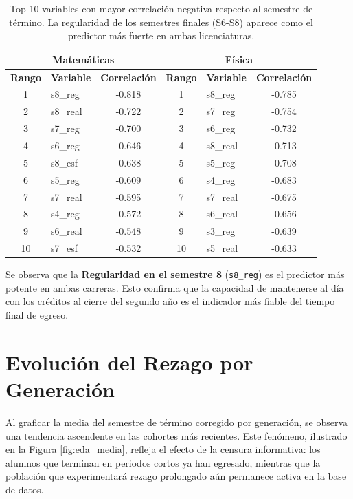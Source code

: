 \begin{table}[H]
\centering
\footnotesize
\begin{tabular}{|c|l|c|c|l|c|}
\hline
\multicolumn{3}{|c|}{\textbf{Matemáticas}} & \multicolumn{3}{c|}{\textbf{Física}} \\ \hline
\textbf{Rango} & \textbf{Variable} & \textbf{Correlación} & \textbf{Rango} & \textbf{Variable} & \textbf{Correlación} \\ \hline
1 & s8\_reg & -0.818 & 1 & s8\_reg & -0.785 \\ \hline
2 & s8\_real & -0.722 & 2 & s7\_reg & -0.754 \\ \hline
3 & s7\_reg & -0.700 & 3 & s6\_reg & -0.732 \\ \hline
4 & s6\_reg & -0.646 & 4 & s8\_real & -0.713 \\ \hline
5 & s8\_esf & -0.638 & 5 & s5\_reg & -0.708 \\ \hline
6 & s5\_reg & -0.609 & 6 & s4\_reg & -0.683 \\ \hline
7 & s7\_real & -0.595 & 7 & s7\_real & -0.675 \\ \hline
8 & s4\_reg & -0.572 & 8 & s6\_real & -0.656 \\ \hline
9 & s6\_real & -0.548 & 9 & s3\_reg & -0.639 \\ \hline
10 & s7\_esf & -0.532 & 10 & s5\_real & -0.633 \\ \hline
\end{tabular}
\caption{Top 10 variables con mayor correlación negativa respecto al semestre de término. La regularidad de los semestres finales (S6-S8) aparece como el predictor más fuerte en ambas licenciaturas.}
\label{tab:correlaciones_target}
\end{table}

Se observa que la \textbf{Regularidad en el semestre 8} (\texttt{s8\_reg}) es el predictor más potente en ambas carreras. Esto confirma que la capacidad de mantenerse al día con los créditos al cierre del segundo año es el indicador más fiable del tiempo final de egreso.

\section{Evolución del Rezago por Generación}

Al graficar la media del semestre de término corregido por generación, se observa una tendencia ascendente en las cohortes más recientes. Este fenómeno, ilustrado en la Figura \ref{fig:eda_media}, refleja el efecto de la censura informativa: los alumnos que terminan en periodos cortos ya han egresado, mientras que la población que experimentará rezago prolongado aún permanece activa en la base de datos.

